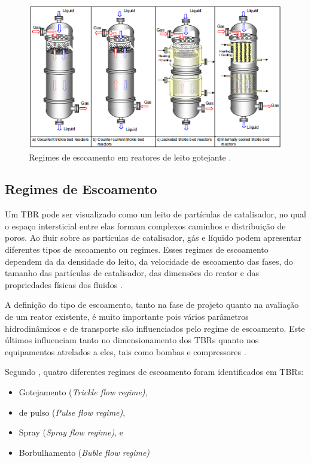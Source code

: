  \begin{figure}[htb]
 \centering \includegraphics[scale=0.75]{images/Chap2/configuracoestbr.png}
 \caption{Regimes de escoamento em reatores de leito gotejante \cite{Gunjal2005}.}
 \label{fig:configuracoestbr}
 \end{figure}


\subsection {Regimes de Escoamento}
\label{sec:escoamento}

Um TBR pode ser visualizado como um leito de partículas de catalisador, no qual
o espaço intersticial entre elas formam complexos caminhos e distribuição de
poros. Ao fluir sobre as partículas de catalisador, gás e líquido podem
apresentar diferentes tipos de escoamento ou regimes. Esses regimes de
escoamento dependem da da densidade do leito, da velocidade de escoamento das
fases, do tamanho das partículas de catalisador, das dimensões do reator e das
propriedades físicas dos fluidos \cite{Ranade2011}.

A definição do tipo de escoamento, tanto na fase de projeto quanto na avaliação
de um reator existente, é muito importante pois vários parâmetros
hidrodinâmicos e de transporte são influenciados pelo regime de escoamento. Este
últimos influenciam tanto no dimensionamento dos TBRs quanto nos
equipamentos atrelados a eles, tais como bombas e compressores
\cite{Ranade2011}.

Segundo , quatro
diferentes regimes de escoamento foram identificados em TBRs:

\begin{itemize}
	\item Gotejamento (\emph{Trickle flow regime)},
	\item de pulso (\emph{Pulse flow regime)},
	\item Spray (\emph{Spray flow regime)}, e
	\item Borbulhamento (\emph{Buble flow regime)}
\end{itemize}

